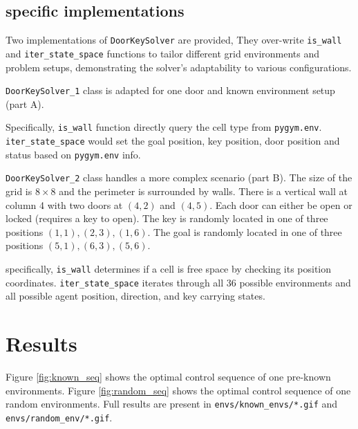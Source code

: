\documentclass[conference]{IEEEtran}
\begin{document}
\subsection{specific implementations}
Two implementations of \texttt{DoorKeySolver} are provided, 
They over-write \texttt{is\_wall} and \texttt{iter\_state\_space} functions
to tailor different grid environments and problem setups, 
demonstrating the solver's adaptability to various configurations. 

\texttt{DoorKeySolver\_1} class 
is adapted for one door and known environment setup (part A).

Specifically, \texttt{is\_wall} function directly query the cell type from \texttt{pygym.env}.
\texttt{iter\_state\_space} would set the goal position, key position, door position and status
based on \texttt{pygym.env} info.

\texttt{DoorKeySolver\_2} class handles a more complex scenario (part B).
The size of the grid is $8 \times 8$ and the perimeter is surrounded by walls. 
There is a vertical wall at column 4 with two doors at $(4, 2)$ and $(4, 5)$. 
Each door can either be open or locked (requires a key to open). 
The key is randomly located in one of three positions ${(1, 1), (2, 3), (1, 6)}$.
The goal is randomly located in one of three positions ${(5, 1), (6, 3), (5, 6)}$.

specifically, \texttt{is\_wall} determines if a cell is free space by checking its position coordinates.
\texttt{iter\_state\_space} iterates through all 36 possible environments
and all possible agent position, direction, and key carrying states.

\section{Results}
Figure \ref{fig:known_seq} shows the optimal control sequence of one pre-known environments.
Figure \ref{fig:random_seq} shows the optimal control sequence of one random environments.
Full results are present in \texttt{envs/known\_envs/*.gif} and \texttt{envs/random\_env/*.gif}.
\end{document}
